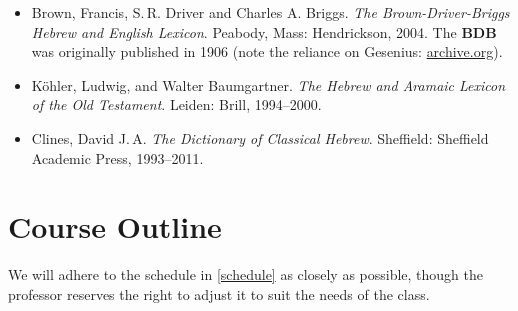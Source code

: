\documentclass[titlepage]{article}
\begin{document}
\begin{itemize}
    \begin{itemize}
      \item
        Brown, Francis, S.\,R. Driver and Charles A. Briggs. \emph{The
        Brown-Driver-Briggs Hebrew and English Lexicon}. Peabody, Mass:
        Hendrickson, 2004. The \textbf{BDB} was originally published in 1906
        (note the reliance on Gesenius: \href{https://archive.org/details/hebrewenglishlex00geseuoft}{archive.org}).
      \item
        Köhler, Ludwig, and Walter Baumgartner. \emph{The Hebrew
        and Aramaic Lexicon of the Old Testament}. Leiden: Brill,
        1994--2000.
      \item
        Clines, David J.\,A. \emph{The Dictionary of Classical Hebrew}.
        Sheffield: Sheffield Academic Press, 1993--2011.
    \end{itemize}

\end{itemize}


\section{Course Outline}
\label{outline}

We will adhere to the schedule in \autoref{schedule} as closely as
possible, though the professor reserves the right to adjust it to suit
the needs of the class.
\end{document}
